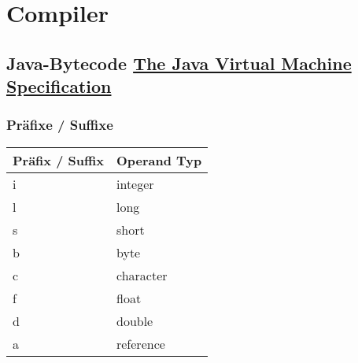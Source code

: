 \chapter{Compiler}
\section{Java-Bytecode \href{https://docs.oracle.com/javase/specs/jvms/se10/jvms10.pdf}{The Java Virtual Machine Specification}}
\subsection{Präfixe / Suffixe}
\begin{table}[h]
	\centering
	\label{my-label}
	\begin{tabular}{l|l}
		Präfix / Suffix	& Operand Typ\\ \hline
		i	&	integer		\\ \hline
		l	&	long		\\ \hline
		s	&	short		\\ \hline
		b	&	byte		\\ \hline
		c	&	character	\\ \hline
		f	&	float		\\ \hline
		d	&	double		\\ \hline
		a	&	reference	\\
	\end{tabular}
\end{table}
